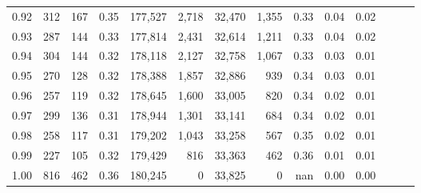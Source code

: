 \begin{tabular}{rrrrrrrrrrrrrr}
0.92 &    312 &  167 &  0.35 &  177,527 &    2,718 &  32,470 &   1,355 &  0.33 &  0.04 &      0.02 \\
0.93 &    287 &  144 &  0.33 &  177,814 &    2,431 &  32,614 &   1,211 &  0.33 &  0.04 &      0.02 \\
0.94 &    304 &  144 &  0.32 &  178,118 &    2,127 &  32,758 &   1,067 &  0.33 &  0.03 &      0.01 \\
0.95 &    270 &  128 &  0.32 &  178,388 &    1,857 &  32,886 &     939 &  0.34 &  0.03 &      0.01 \\
0.96 &    257 &  119 &  0.32 &  178,645 &    1,600 &  33,005 &     820 &  0.34 &  0.02 &      0.01 \\
0.97 &    299 &  136 &  0.31 &  178,944 &    1,301 &  33,141 &     684 &  0.34 &  0.02 &      0.01 \\
0.98 &    258 &  117 &  0.31 &  179,202 &    1,043 &  33,258 &     567 &  0.35 &  0.02 &      0.01 \\
0.99 &    227 &  105 &  0.32 &  179,429 &      816 &  33,363 &     462 &  0.36 &  0.01 &      0.01 \\
1.00 &    816 &  462 &  0.36 &  180,245 &        0 &  33,825 &       0 &   nan &  0.00 &      0.00 \\
\bottomrule
\end{tabular}
